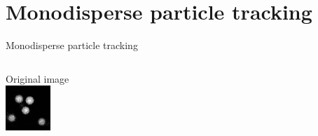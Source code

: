\section{Monodisperse particle tracking}
\begin{frame}{Monodisperse particle tracking}
	\begin{columns}[T]
	Original image\\
	\includegraphics[width=\textwidth]{dillute_raw}
	

\end{columns}
\end{frame}
